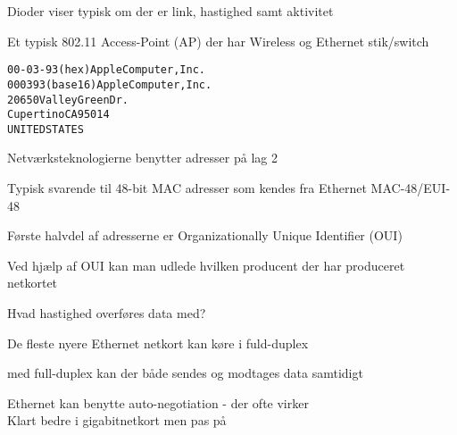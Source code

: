 \documentclass[Screen16to9,17pt]{foils}
\begin{document}


\centerline{Dioder viser typisk om der er link, hastighed samt aktivitet}



\begin{list1}
\item Et typisk 802.11 Access-Point (AP) der har Wireless og Ethernet stik/switch
\end{list1}


\begin{alltt}
00-03-93   (hex)        Apple Computer, Inc.
000393     (base 16)    Apple Computer, Inc.
                        20650 Valley Green Dr.
                        Cupertino CA 95014
                        UNITED STATES
\end{alltt}
\begin{list1}
\item Netværksteknologierne benytter adresser på lag 2
\item Typisk svarende til 48-bit MAC adresser som kendes fra Ethernet MAC-48/EUI-48
\item Første halvdel af adresserne er Organizationally Unique Identifier (OUI)
\item Ved hjælp af OUI kan man udlede hvilken producent der har produceret netkortet
\item {}
\end{list1}



\begin{list1}
\item Hvad hastighed overføres data med?
\item De fleste nyere Ethernet netkort kan køre i fuld-duplex
\item med full-duplex kan der både sendes og modtages data samtidigt
\item Ethernet kan benytte auto-negotiation - der ofte virker\\
Klart bedre i gigabitnetkort men pas på
\end{list1}
\end{document}
